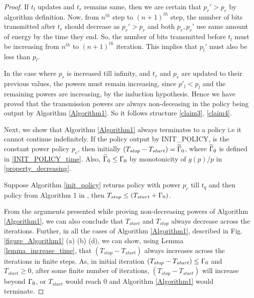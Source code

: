 \begin{proof}
If $t_l$ updates and $t_r$ remains same, then we are certain that $p_{r}'>p_r$ by algorithm definition. Now, from $n^{th}$ step to $(n+1)^{th}$ step, the number of bits transmitted after $t_r$ should decrease as $p_{r}'>p_r$ and both $p_r,p_r'$ use same amount of energy by the time they end. So, the number of bits transmitted before $t_l$ must be increasing from $n^{th}$ to $(n+1)^{th}$ iteration. This implies that $p_l'$ must also be less than $p_l$.

In the case where $p_r$ is increased till infinity, and $t_r$ and $p_r$ are updated to their previous values, the powers must remain increasing, since $p'_l <p_l$ and the remaining powers are increasing, by the induction hypothesis. Hence we have proved that the transmission powers are always non-deceasing in the policy being output by Algorithm \ref{Algorithm1}. So it follows structure \eqref{claim3}, \eqref{claim4}.


Next, we show that Algorithm \ref{Algorithm1} always terminates to a policy i.e it cannot continue indefinitely. If the policy output by INIT\_POLICY, is the constant power policy $p_c$, then initially $(T_{stop}-T_{start})=\widetilde{\Gamma}_0$, where $\widetilde{\Gamma}_0$ is defined in \eqref{INIT_POLICY_time}. Also, $\widetilde{\Gamma}_0\le \Gamma_0$ by monotonicity of $g(p)/p$ in \eqref{property_decreasing}.

Suppose Algorithm \ref{init_policy} returns policy with power $p_c$ till $t_q$ and then policy from Algorithm 1 in  \cite{Yang}, then $T_{stop}\le (T_{start}+ \Gamma_0)$. 

From the arguments presented while proving non-decreasing powers of Algorithm \ref{Algorithm1}, we can also conclude that $T_{start}$ and $T_{stop}$ always decrease across the iterations. Further, in all the cases of Algorithm \ref{Algorithm1}, described in Fig. \ref{figure_Algorithm1} (a) (b) (d), we can show, using Lemma \ref{lemma_increase_time}, that $(T_{stop}-T_{start})$ always increases across the iterations in finite steps. As, in initial iteration $(T_{stop}-T_{start})\le \Gamma_0$ and $T_{start}\ge 0$, after some finite number of iterations, $(T_{stop}-T_{start})$ will increase beyond $\Gamma_0$, or $T_{start}$ would reach 0 and Algorithm \ref{Algorithm1} would terminate.


\end{proof}
